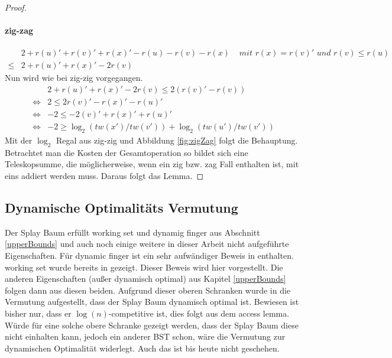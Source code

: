 \documentclass[a4paper,12pt]{article}
\begin{document}
\begin{proof}
	\paragraph{zig-zag} 
	\begin{align*}
	&2 + r\left(u\right)' +r\left(v\right)' +r\left(x\right)' - r\left(u\right)- r\left(v\right)- r\left(x\right) &\textit{ mit $r\left(x\right) =  r\left(v\right)'$ und $r\left(v\right) \leq  r\left(u\right)$} \\
	\leq& 2 + r\left(u\right)' +r\left(x\right)' - 2 r\left(v\right)
	\end{align*}
	Nun wird wie bei zig-zig vorgegangen.
	\begin{align*}
	&  2 + r\left(u\right)' +r\left(x\right)' - 2 r\left(v\right) \leq  2\left(r\left(v\right)'- r\left(v\right)\right)\\
	\Leftrightarrow &2 \leq 2r\left(v\right)' -  r\left(x\right)' - r\left(u\right)'\\
	\Leftrightarrow &-2 \leq -2\left(v\right)' +  r\left(x\right)' + r\left(u\right)'\\
	\Leftrightarrow & -2 \geq \log_2\left(\mathit{tw}\left(x'\right) / \mathit{tw}\left(v'\right)\right) + \log_2\left(\mathit{tw}\left(u'\right) / \mathit{tw}\left(v'\right)\right)
	\end{align*}
	Mit der $\log_2$ Regal aus zig-zig und Abbildung \ref{fig:zigZag} folgt die Behauptung.
	Betrachtet man die Kosten der Gesamtoperation so bildet sich eine Teleskopsumme, die möglicherweise, wenn ein  zig bzw. zag Fall enthalten ist, mit eins addiert werden muss. Daraus folgt das Lemma.
\end{proof}

\subsection{Dynamische Optimalitäts Vermutung}
Der Splay Baum erfüllt working set und dynamig finger aus Abschnitt \ref{upperBounds} und auch noch einige weitere in dieser Arbeit nicht aufgeführte Eigenschaften. Für dynamic finger ist ein sehr aufwändiger Beweis in \cite{dynFinger} enthalten. working set wurde bereits in \cite{splay} gezeigt. Dieser Beweis wird hier vorgestellt. Die anderen Eigenschaften (außer dynamisch optimal) aus Kapitel \ref{upperBounds} folgen dann aus diesen beiden. Aufgrund dieser oberen Schranken wurde in \cite{splay} die Vermutung aufgestellt, dass der Splay Baum dynamisch optimal ist. Bewiesen ist bisher nur, dass er $\log \left(n\right)$-competitive ist, dies folgt aus dem access lemma. Würde für eine solche obere Schranke gezeigt werden, dass der Splay Baum diese nicht einhalten kann, jedoch ein anderer BST schon, wäre die Vermutung zur dynamischen Optimalität widerlegt. Auch das ist bis heute nicht geschehen. 
\end{document}
